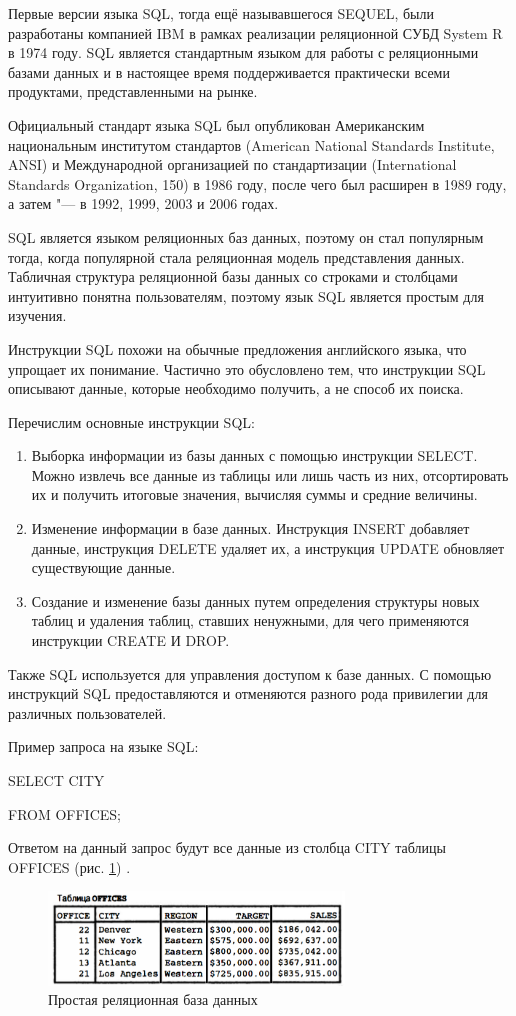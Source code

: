 Первые версии языка SQL, тогда ещё называвшегося SEQUEL, были разработаны компанией IBM в рамках реализации реляционной СУБД
System R в 1974 году. SQL является стандартным языком для работы с реляционными базами данных и в настоящее время 
поддерживается практически всеми продуктами, представленными на рынке.

Официальный стандарт языка SQL был опубликован Американским национальным институтом стандартов (American National Standards Institute, ANSI) и Международной организацией по стандартизации (International Standards Organization, 150) в 1986 году, после чего был расширен в 1989 году, а затем "--- в 1992, 1999, 2003 и 2006 годах.

SQL является языком реляционных баз данных, поэтому он стал популярным тогда, когда популярной стала реляционная модель представления данных. Табличная структура реляционной базы данных со строками и столбцами интуитивно понятна пользователям, поэтому язык SQL является простым для изучения. 

Инструкции SQL похожи на обычные предложения английского языка, что упрощает их понимание. Частично это обусловлено тем, что инструкции SQL описывают данные, которые необходимо получить, а не способ их поиска.

Перечислим основные инструкции SQL:

\begin{enumerate}
    \item Выборка информации из базы данных с помощью инструкции SELECT. Можно извлечь все данные из таблицы или лишь часть из них, отсортировать их и получить итоговые значения, вычисляя суммы и средние величины.
    \item Изменение информации в базе данных. Инструкция INSERT добавляет данные, инструкция DELETE удаляет их, а инструкция UPDATE обновляет существующие данные.
    \item Создание и изменение базы данных путем определения структуры новых таблиц и удаления таблиц, ставших ненужными, для чего применяются инструкции CREATE И DROP.
\end{enumerate}

Также SQL используется для управления доступом к базе данных. С помощью инструкций SQL предоставляются и отменяются разного рода привилегии для различных пользователей. 

Пример запроса на языке SQL: 

SELECT CITY

    FROM OFFICES;

Ответом на данный запрос будут все данные из столбца CITY таблицы OFFICES (рис. \ref{fig:graph}) \cite{10}.
\begin{figure}[H]
    \centering
    \includegraphics[width=0.7\textwidth]{offices.png}
    \caption{Простая реляционная база данных}
    \label{fig:graph}
\end{figure}

